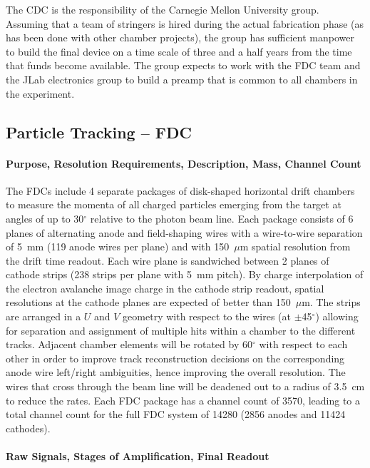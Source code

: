 \documentclass[11pt]{article}
\begin{document}
The CDC is the responsibility of the Carnegie Mellon University group. Assuming that
a team of stringers is hired during the actual fabrication phase (as has been
done with other chamber projects), the group has sufficient manpower to build the
final device on a time scale of three and a half years from the time that funds
become available. The group expects to work with the FDC team and the JLab electronics
group to build a preamp that is common to all chambers in the experiment.  


\subsection{Particle Tracking -- FDC}

\paragraph{Purpose, Resolution Requirements, Description, Mass, Channel Count}

The FDCs include 4 separate packages of disk-shaped horizontal drift chambers 
to measure the momenta of all charged particles emerging from the target at 
angles of up to 30$^{\circ}$ relative to the photon beam line.  Each package
consists of 6 planes of alternating anode and field-shaping wires with a 
wire-to-wire separation of 5~mm (119 anode wires per plane) and with 150~$\mu$m 
spatial resolution from the drift time readout.  Each wire plane is sandwiched 
between 2 planes of cathode strips (238 strips per plane with 5~mm pitch).  By 
charge interpolation of the electron avalanche image charge in the cathode strip 
readout, spatial resolutions at the cathode planes are expected of better than 
150~$\mu$m.  The strips are arranged in a $U$ and $V$ geometry with respect to 
the wires (at $\pm$45$^{\circ}$) allowing for separation and assignment of 
multiple hits within a chamber to the different tracks.  Adjacent chamber 
elements will be rotated by 60$^{\circ}$ with respect to each other in order 
to improve track reconstruction decisions on the corresponding anode wire 
left/right ambiguities, hence improving the overall resolution.  The wires 
that cross through the beam line will be deadened out to a radius of 3.5~cm 
to reduce the rates.  Each FDC package has a channel count of 3570, leading 
to a total channel count for the full FDC system of 14280 (2856 anodes and
11424 cathodes).

\paragraph{Raw Signals, Stages of Amplification, Final Readout}
\end{document}
